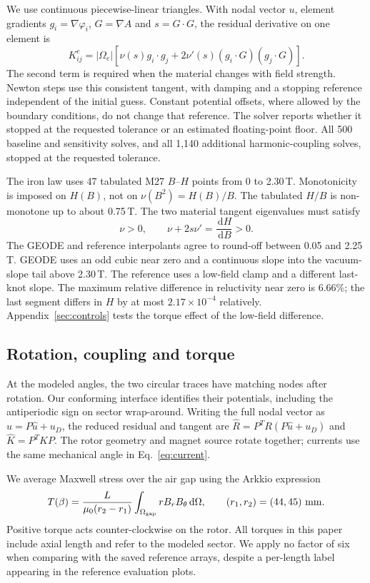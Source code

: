 \documentclass{anvil-paper}
\newcommand{\dd}{\,\mathrm{d}}
\begin{document}
We use continuous piecewise-linear triangles. With nodal vector $u$,
element gradients $g_i=\nabla\varphi_i$, $G=\nabla A$ and $s=G\cdot G$,
the residual derivative on one element is
\begin{equation}
 K^e_{ij}=|\Omega_e|\left[\nu(s)g_i\cdot g_j
       +2\nu'(s)(g_i\cdot G)(g_j\cdot G)\right].
 \label{eq:tangent}
\end{equation}
The second term is required when the material changes with field strength.
Newton steps use this consistent tangent, with damping and a stopping
reference independent of the initial guess. Constant potential offsets,
where allowed by the boundary conditions, do not change that reference.
The solver reports whether it stopped at the requested tolerance or an
estimated floating-point floor. All 500 baseline and sensitivity solves, and all 1,140
additional harmonic-coupling solves, stopped at the requested tolerance.

The iron law uses 47 tabulated M27 $B$--$H$ points from 0 to 2.30\,T.
Monotonicity is imposed on $H(B)$, not on $\nu(B^2)=H(B)/B$.
The tabulated $H/B$ is non-monotone up to about 0.75\,T.
The two material tangent eigenvalues must satisfy
\begin{equation}
 \nu>0,\qquad \nu+2s\nu'=\frac{\dd H}{\dd B}>0.
\end{equation}
The GEODE and reference interpolants agree to round-off between 0.05 and
2.25\,T. GEODE uses an odd cubic near zero and a continuous slope into the
vacuum-slope tail above 2.30\,T. The reference uses a low-field clamp and
a different last-knot slope. The maximum relative difference in
reluctivity near zero is 6.66\%; the last segment differs in $H$ by at
most $2.17\times10^{-4}$ relatively. Appendix~\ref{sec:controls} tests the
torque effect of the low-field difference.

\subsection{Rotation, coupling and torque}
At the modeled angles, the two circular traces have matching nodes after
rotation. Our conforming interface identifies their potentials, including
the antiperiodic sign on sector wrap-around. Writing the full nodal vector
as $u=P\hat u+u_D$, the reduced residual and tangent are
$\hat R=P^T R(P\hat u+u_D)$ and $\hat K=P^T K P$.
The rotor geometry and magnet source rotate together; currents use the
same mechanical angle in Eq.~\eqref{eq:current}.

We average Maxwell stress over the air gap using the Arkkio expression
\citep{arkkio1987}
\begin{equation}
 T(\beta)=\frac{L}{\mu_0(r_2-r_1)}
  \int_{\Omega_{\rm gap}}r B_r B_\theta\dd\Omega,
 \qquad(r_1,r_2)=(44,45)\ {\rm mm}.
 \label{eq:torque}
\end{equation}
Positive torque acts counter-clockwise on the rotor. All torques in this
paper include axial length and refer to the modeled sector. We apply no
factor of six when comparing with the saved reference arrays, despite a
per-length label appearing in the reference evaluation plots.
\end{document}
